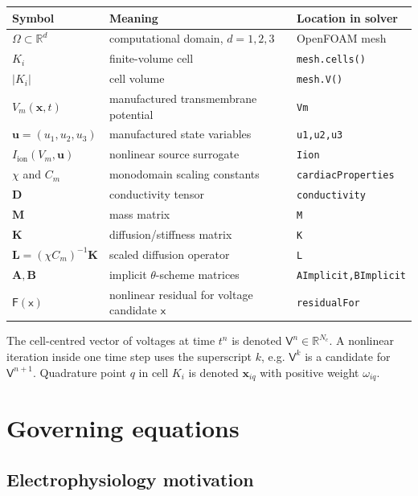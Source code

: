 \documentclass[11pt,a4paper]{article}
\newcommand{\code}[1]{\texttt{\small #1}}
\newcommand{\Vm}{V_m}
\newcommand{\Iion}{I_{\mathrm{ion}}}
\newcommand{\Dten}{\mathbf{D}}
\newcommand{\Mmass}{\mathbf{M}}
\newcommand{\Kstif}{\mathbf{K}}
\newcommand{\Lop}{\mathbf{L}}
\newcommand{\Aimp}{\mathbf{A}}
\newcommand{\Bimp}{\mathbf{B}}
\newcommand{\Fres}{\mathsf{F}}
\newcommand{\R}{\mathbb{R}}
\begin{document}
\begin{center}
\begin{tabular}{@{}lll@{}}
\toprule
Symbol & Meaning & Location in solver \\
\midrule
$\Omega\subset\R^d$ & computational domain, $d=1,2,3$ & OpenFOAM mesh \\
$K_i$ & finite-volume cell & \code{mesh.cells()} \\
$|K_i|$ & cell volume & \code{mesh.V()} \\
$\Vm(\mathbf{x},t)$ & manufactured transmembrane potential & \code{Vm} \\
$\mathbf{u}=(u_1,u_2,u_3)$ & manufactured state variables & \code{u1,u2,u3} \\
$\Iion(\Vm,\mathbf{u})$ & nonlinear source surrogate & \code{Iion} \\
$\chi$ and $C_m$ & monodomain scaling constants & \code{cardiacProperties} \\
$\Dten$ & conductivity tensor & \code{conductivity} \\
$\Mmass$ & mass matrix & \code{M} \\
$\Kstif$ & diffusion/stiffness matrix & \code{K} \\
$\Lop=(\chi C_m)^{-1}\Kstif$ & scaled diffusion operator & \code{L} \\
$\Aimp,\Bimp$ & implicit $\theta$-scheme matrices & \code{AImplicit,BImplicit} \\
$\Fres(\mathsf{x})$ & nonlinear residual for voltage candidate $\mathsf{x}$ & \code{residualFor} \\
\bottomrule
\end{tabular}
\end{center}

The cell-centred vector of voltages at time $t^n$ is denoted
$\mathsf{V}^n\in\R^{N_c}$. A nonlinear iteration inside one time step uses the
superscript $k$, e.g. $\mathsf{V}^k$ is a candidate for
$\mathsf{V}^{n+1}$. Quadrature point $q$ in cell $K_i$ is denoted
$\mathbf{x}_{iq}$ with positive weight $\omega_{iq}$.

\section{Governing equations}

\subsection{Electrophysiology motivation}
\end{document}

